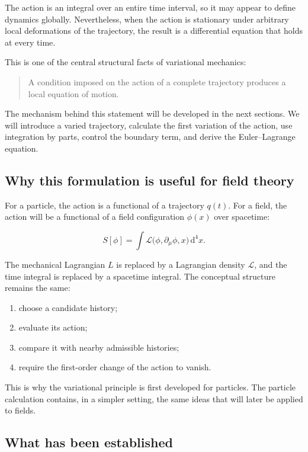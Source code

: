The action is an integral over an entire time interval, so it may appear to define dynamics globally. Nevertheless, when the action is stationary under arbitrary local deformations of the trajectory, the result is a differential equation that holds at every time.

This is one of the central structural facts of variational mechanics:

\begin{quote}
A condition imposed on the action of a complete trajectory produces a local equation of motion.
\end{quote}

The mechanism behind this statement will be developed in the next sections. We will introduce a varied trajectory, calculate the first variation of the action, use integration by parts, control the boundary term, and derive the Euler--Lagrange equation.

\subsection{Why this formulation is useful for field theory}

For a particle, the action is a functional of a trajectory \(q(t)\). For a field, the action will be a functional of a field configuration \(\phi(x)\) over spacetime:

\[
S[\phi]
=
\int
\mathcal{L}\bigl(\phi,\partial_{\mu}\phi,x\bigr)
\,\mathrm{d}^{4}x.
\]

The mechanical Lagrangian \(L\) is replaced by a Lagrangian density \(\mathcal{L}\), and the time integral is replaced by a spacetime integral. The conceptual structure remains the same:

\begin{enumerate}
    \item choose a candidate history;
    \item evaluate its action;
    \item compare it with nearby admissible histories;
    \item require the first-order change of the action to vanish.
\end{enumerate}

This is why the variational principle is first developed for particles. The particle calculation contains, in a simpler setting, the same ideas that will later be applied to fields.

\subsection{What has been established}

